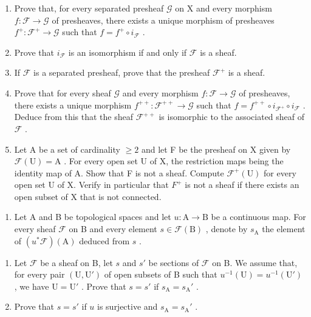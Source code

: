 \begin{enumerate}
\def\labelenumi{\alph{enumi})}
\setcounter{enumi}{4}
\item
  Prove that, for every separated presheaf \(\mathcal{G}\) on X and every morphism \(f\colon \mathcal{F} \to \mathcal{G}\) of presheaves, there exists a unique morphism of presheaves \(f^{+}\colon \mathcal{F}^{+} \to \mathcal{G}\) such that \(f = f^{+} \circ i_{\mathcal{F}}\) .
\item
  Prove that \(i_{\mathcal{F}}\) is an isomorphism if and only if \(\mathcal{F}\) is a sheaf.
\item
  If \(\mathcal{F}\) is a separated presheaf, prove that the presheaf \(\mathcal{F}^{+}\) is a sheaf.
\item
  Prove that for every sheaf \(\mathcal{G}\) and every morphism \(f\colon \mathcal{F}\to \mathcal{G}\) of presheaves, there exists a unique morphism \(f^{++}\colon \mathcal{F}^{++}\to \mathcal{G}\) such that \(f = f^{++}\circ i_{\mathcal{F}^+}\circ i_{\mathcal{F}}\) . Deduce from this that the sheaf \(\mathcal{F}^{++}\) is isomorphic to the associated sheaf of \(\mathcal{F}\) .
\item
  Let A be a set of cardinality \(\geqslant2\) and let F be the presheaf on X given by \(\mathcal{F}(\mathrm{U})=\mathrm{A}\) . For every open set U of X, the restriction maps being the identity map of A. Show that F is not a sheaf. Compute \(\mathcal{F}^{+}(\mathrm{U})\) for every open set U of X. Verify in particular that \(F^{+}\) is not a sheaf if there exists an open subset of X that is not connected.
\end{enumerate}

\begin{enumerate}
\def\labelenumi{\arabic{enumi})}
\setcounter{enumi}{4}
\tightlist
\item
  Let A and B be topological spaces and let \(u\colon\mathrm{A}\to\mathrm{B}\) be a continuous map. For every sheaf \(\mathcal{F}\) on B and every element \(s\in\mathcal{F}(\mathrm{B})\) , denote by \(s_{\mathrm{A}}\) the element of \((u^{*}\mathcal{F})(\mathrm{A})\) deduced from \(s\) .
\end{enumerate}

\begin{enumerate}
\def\labelenumi{\alph{enumi})}
\item
  Let \(\mathcal{F}\) be a sheaf on B, let \(s\) and \(s'\) be sections of \(\mathcal{F}\) on B. We assume that, for every pair \((\mathrm{U},\mathrm{U}')\) of open subsets of B such that \(u^{-1}(\mathrm{U}) = u^{-1}(\mathrm{U}')\) , we have \(\mathrm{U} = \mathrm{U}'\) . Prove that \(s = s'\) if \(s_{\mathrm{A}} = s_{\mathrm{A}}'\) .
\item
  Prove that \(s = s'\) if \(u\) is surjective and \(s_{\mathrm{A}} = s_{\mathrm{A}}'\) .
\end{enumerate}

